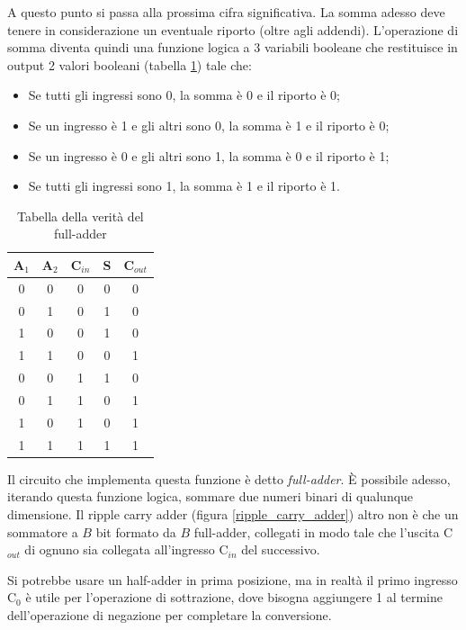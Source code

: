 \documentclass{article}
\begin{document}
A questo punto si passa alla prossima cifra significativa. La somma adesso deve tenere in considerazione un eventuale riporto (oltre agli addendi). L'operazione di somma diventa quindi una funzione logica a 3 variabili booleane che restituisce in output 2 valori booleani (tabella \ref{Tabella_full_adder}) tale che:
\begin{itemize}
  \item [\textendash] Se tutti gli ingressi sono 0, la somma è 0 e il riporto è 0;
  \item [\textendash] Se un ingresso è 1 e gli altri sono 0, la somma è 1 e il riporto è 0;
  \item [\textendash] Se un ingresso è 0 e gli altri sono 1, la somma è 0 e il riporto è 1;
  \item [\textendash] Se tutti gli ingressi sono 1, la somma è 1 e il riporto è 1.
\end{itemize}

\begin{table}[h]
  \centering
  \begin{tabular}{| c | c | c || c | c |}
  \hline
  A$_1$ & A$_2$ & C$_{in}$ & S & C$_{out}$ \\ \hline
  0 & 0 & 0 & 0 & 0 \\ \hline
  0 & 1 & 0 & 1 & 0 \\ \hline
  1 & 0 & 0 & 1 & 0 \\ \hline
  1 & 1 & 0 & 0 & 1 \\ \hline
  0 & 0 & 1 & 1 & 0 \\ \hline
  0 & 1 & 1 & 0 & 1 \\ \hline
  1 & 0 & 1 & 0 & 1 \\ \hline
  1 & 1 & 1 & 1 & 1 \\ \hline
  \end{tabular}
  \caption{Tabella della verità del full-adder}
  \label{Tabella_full_adder}
\end{table}

Il circuito che implementa questa funzione è detto \textit{full-adder}. È possibile adesso, iterando questa funzione logica, sommare due numeri binari di qualunque dimensione. Il ripple carry adder (figura \ref{ripple_carry_adder}) altro non è che un sommatore a $B$ bit formato da $B$ full-adder, collegati in modo tale che l'uscita C$_{out}$ di ognuno sia collegata all'ingresso C$_{in}$ del successivo.

\vspace{3mm}

Si potrebbe usare un half-adder in prima posizione, ma in realtà il primo ingresso C$_0$ è utile per l'operazione di sottrazione, dove bisogna aggiungere 1 al termine dell'operazione di negazione per completare la conversione.
\end{document}
